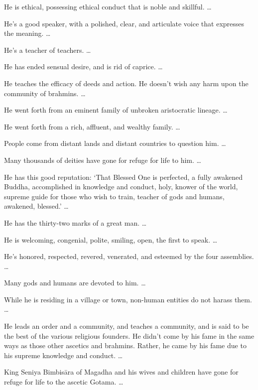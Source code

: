 \documentclass[12pt,openany]{book}%
\begin{document}
He is ethical, possessing ethical conduct that is noble and skillful. … 

He’s a good speaker, with a polished, clear, and articulate voice that expresses the meaning. … 

He’s a teacher of teachers. … 

He has ended sensual desire, and is rid of caprice. … 

He teaches the efficacy of deeds and action. He doesn’t wish any harm upon the community of brahmins. … 

He went forth from an eminent family of unbroken aristocratic lineage. … 

He went forth from a rich, affluent, and wealthy family. … 

People come from distant lands and distant countries to question him. … 

Many thousands of deities have gone for refuge for life to him. … 

He has this good reputation: ‘That Blessed One is perfected, a fully awakened Buddha, accomplished in knowledge and conduct, holy, knower of the world, supreme guide for those who wish to train, teacher of gods and humans, awakened, blessed.’ … 

He has the thirty-two marks of a great man. … 

He is welcoming, congenial, polite, smiling, open, the first to speak. … 

He’s honored, respected, revered, venerated, and esteemed by the four assemblies. … 

Many gods and humans are devoted to him. … 

While he is residing in a village or town, non-human entities do not harass them. … 

He leads an order and a community, and teaches a community, and is said to be the best of the various religious founders. He didn’t come by his fame in the same ways as those other ascetics and brahmins. Rather, he came by his fame due to his supreme knowledge and conduct. … 

King Seniya \textsanskrit{Bimbisāra} of Magadha and his wives and children have gone for refuge for life to the ascetic Gotama. … 
\end{document}
